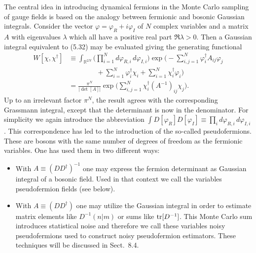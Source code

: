 The central idea in introducing dynamical fermions in the Monte Carlo sampling
of gauge fields is based on the analogy between fermionic and bosonic Gaussian
integrals. Consider the vector $\varphi = \varphi_R + i\varphi_I$ of $N$
complex variables and a matrix $A$ with eigenvalues $\lambda$ which all have a
positive real part $\Re\lambda > 0$. Then a Gaussian integral equivalent to
(5.32) may be evaluated giving the generating functional
\begin{equation}
\begin{split}
W[\chi,\chi^\dagger] &\equiv \int_{\mathbb{R}^{2N}}\Big(\prod_{i=1}^{N}d\varphi_{R,i}\,d\varphi_{I,i}\Big)
\exp\Big(-\sum_{i,j=1}^{N}\varphi_i^\dagger A_{ij}\varphi_j\\
&\qquad\qquad + \sum_{i=1}^{N}\varphi_i^\dagger\chi_i + \sum_{i=1}^{N}\chi_i^\dagger\varphi_i\Big)\\
&= \frac{\pi^N}{|\det[A]|}\exp\Big(\sum_{i,j=1}^{N}\chi_i^\dagger(A^{-1})_{ij}\chi_j\Big).
\end{split}
\end{equation}
Up to an irrelevant factor $\pi^N$, the result agrees with the corresponding
Grassmann integral, except that the determinant is now in the denominator.
For simplicity we again introduce the abbreviation
$\int D[\varphi_R]D[\varphi_I] \equiv \prod_i d\varphi_{R,i}\,d\varphi_{I,i}$.
This correspondence has led to the introduction of the so-called
pseudofermions. These are bosons with the same number of degrees of freedom as
the fermionic variables. One has used them in two different ways:
\begin{itemize}
  \item With $A \equiv (DD^\dagger)^{-1}$ one may express the fermion
        determinant as Gaussian integral of a bosonic field. Used in that
        context we call the variables pseudofermion fields (see below).
  \item With $A \equiv (DD^\dagger)$ one may utilize the Gaussian integral in
        order to estimate matrix elements like $D^{-1}(n|m)$ or sums like
        $\operatorname{tr}[D^{-1}]$. This Monte Carlo sum introduces statistical noise and
        therefore we call these variables noisy pseudofermions used to
        construct noisy pseudofermion estimators. These techniques will be
        discussed in Sect.~8.4.
\end{itemize}

